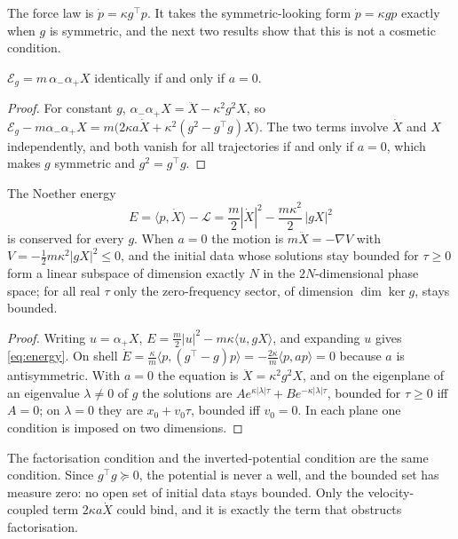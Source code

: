 The force law is $\dot p=\kappa g^{\!\top}p$. It takes the symmetric-looking form $\dot p=\kappa gp$ exactly when $g$ is symmetric, and the
next two results show that this is not a cosmetic condition.

\begin{theorem}[Factorisation]
\label{thm:factor}
$\mathcal E_g=m\,\alpha_-\alpha_+X$ identically if and only if $a=0$.
\end{theorem}

\begin{proof}
For constant $g$, $\alpha_-\alpha_+X=\ddot X-\kappa^2g^2X$, so $\mathcal E_g-m\alpha_-\alpha_+X=m\bigl(2\kappa a\dot X+\kappa^2(g^2-g^{\!\top}g)X\bigr)$. The two
terms involve $\dot X$ and $X$ independently, and both vanish for all trajectories if and only if $a=0$, which makes $g$ symmetric and
$g^2=g^{\!\top}g$.
\end{proof}

\begin{proposition}
\label{prop:inverted}
The Noether energy
\begin{equation}
\label{eq:energy}
E=\langle p,\dot X\rangle-\mathcal L=\frac m2|\dot X|^2-\frac{m\kappa^2}{2}\,|gX|^2
\end{equation}
is conserved for every $g$. When $a=0$ the motion is $m\ddot X=-\nabla V$ with $V=-\tfrac12m\kappa^2|gX|^2\le0$, and the initial data whose
solutions stay bounded for $\tau\ge0$ form a linear subspace of dimension exactly $N$ in the $2N$-dimensional phase space; for all real
$\tau$ only the zero-frequency sector, of dimension $\dim\ker g$, stays bounded.
\end{proposition}

\begin{proof}
Writing $u=\alpha_+X$, $E=\tfrac m2|u|^2-m\kappa\langle u,gX\rangle$, and expanding $u$ gives \eqref{eq:energy}. On shell
$\dot E=\tfrac\kappa m\langle p,(g^{\!\top}-g)p\rangle=-\tfrac{2\kappa}m\langle p,ap\rangle=0$ because $a$ is antisymmetric. With $a=0$ the equation is
$\ddot X=\kappa^2g^2X$, and on the eigenplane of an eigenvalue $\lambda\neq0$ of $g$ the solutions are $Ae^{\kappa|\lambda|\tau}+Be^{-\kappa|\lambda|\tau}$,
bounded for $\tau\ge0$ iff $A=0$; on $\lambda=0$ they are $x_0+v_0\tau$, bounded iff $v_0=0$. In each plane one condition is imposed on two
dimensions.
\end{proof}

The factorisation condition and the inverted-potential condition are the same condition. Since $g^{\!\top}g\succeq0$, the potential is
never a well, and the bounded set has measure zero: no open set of initial data stays bounded. Only the velocity-coupled term $2\kappa
a\dot X$ could bind, and it is exactly the term that obstructs factorisation.

